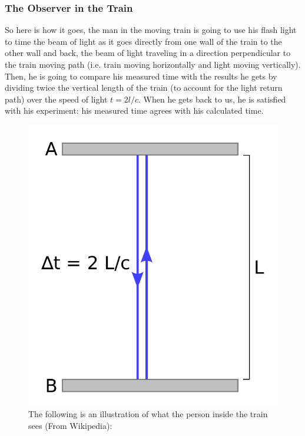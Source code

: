\documentclass[12pt, letterpaper]{article}
\begin{document}
    \subsubsection*{The Observer in the Train}
    So here is how it goes, the man in the moving train is going to use his 
    flash light to time the beam of light as it goes directly from one wall 
    of the train to the other wall and back, the beam of light traveling 
    in a direction perpendicular to the train moving path (i.e. train moving 
    horizontally and light moving vertically). Then, he is going to 
    compare his measured time with the results he gets by dividing twice 
    the vertical length of the train (to account for the light return path) 
    over the speed of light $t=2l/c$.
    When he gets back to us, he is satisfied with his experiment: his 
    measured time agrees with his calculated time.       

    \begin{figure}[h!]
        \caption{The following is an illustration of what the person inside 
        the train sees (From Wikipedia):}
        \centering
        \includegraphics[scale=0.49]{time_dilation_inside_train.pdf}
    \end{figure}    
    
\end{document}
